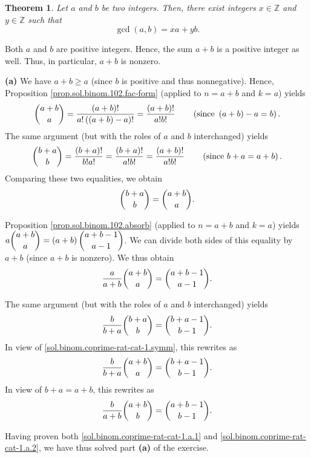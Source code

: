 \documentclass[paper=a4, fontsize=12pt]{scrartcl}%
\theoremstyle{plainsl}
\newtheorem{theorem}{Theorem}[section]
\theoremstyle{definition}
\theoremstyle{remark}
\begin{document}
\begin{theorem}
\label{thm.ent.gcd.bezout}Let $a$ and $b$ be two integers. Then, there exist
integers $x\in\mathbb{Z}$ and $y\in\mathbb{Z}$ such that%
\[
\gcd\left(  a,b\right)  =xa+yb.
\]

\end{theorem}

Both $a$ and $b$ are positive integers. Hence, the sum $a+b$ is a positive
integer as well. Thus, in particular, $a+b$ is nonzero.

\textbf{(a)} We have $a+b\geq a$ (since $b$ is positive and thus nonnegative).
Hence, Proposition \ref{prop.sol.binom.102.fac-form} (applied to $n=a+b$ and
$k=a$) yields
\[
\dbinom{a+b}{a}=\dfrac{\left(  a+b\right)  !}{a!\left(  \left(  a+b\right)
-a\right)  !}=\dfrac{\left(  a+b\right)  !}{a!b!}\qquad\left(  \text{since
}\left(  a+b\right)  -a=b\right)  .
\]
The same argument (but with the roles of $a$ and $b$ interchanged) yields
\[
\dbinom{b+a}{b}=\dfrac{\left(  b+a\right)  !}{b!a!}=\dfrac{\left(  b+a\right)
!}{a!b!}=\dfrac{\left(  a+b\right)  !}{a!b!}\qquad\left(  \text{since
}b+a=a+b\right)  .
\]
Comparing these two equalities, we obtain%
\begin{equation}
\dbinom{b+a}{b}=\dbinom{a+b}{a}. \label{sol.binom.coprime-rat-cat-1.symm}%
\end{equation}


Proposition \ref{prop.sol.binom.102.absorb} (applied to $n=a+b$ and $k=a$)
yields $a\dbinom{a+b}{a}=\left(  a+b\right)  \dbinom{a+b-1}{a-1}$. We can
divide both sides of this equality by $a+b$ (since $a+b$ is nonzero). We thus
obtain
\begin{equation}
\dfrac{a}{a+b}\dbinom{a+b}{a}=\dbinom{a+b-1}{a-1}.
\label{sol.binom.coprime-rat-cat-1.a.1}%
\end{equation}


The same argument (but with the roles of $a$ and $b$ interchanged) yields%
\[
\dfrac{b}{b+a}\dbinom{b+a}{b}=\dbinom{b+a-1}{b-1}.
\]
In view of \eqref{sol.binom.coprime-rat-cat-1.symm}, this rewrites as%
\[
\dfrac{b}{b+a}\dbinom{a+b}{a}=\dbinom{b+a-1}{b-1}.
\]
In view of $b+a=a+b$, this rewrites as%
\begin{equation}
\dfrac{b}{a+b}\dbinom{a+b}{b}=\dbinom{a+b-1}{b-1}.
\label{sol.binom.coprime-rat-cat-1.a.2}%
\end{equation}


Having proven both \eqref{sol.binom.coprime-rat-cat-1.a.1} and
\eqref{sol.binom.coprime-rat-cat-1.a.2}, we have thus solved part \textbf{(a)}
of the exercise. \\[0.4cm]
\end{document}
